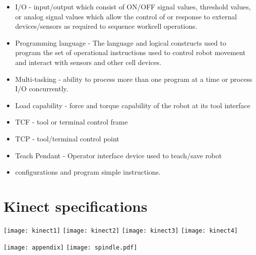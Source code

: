\begin{itemize}
\item I/O - input/output which consist of ON/OFF signal values, threshold values, or analog signal values which allow the control of or response to external devices/sensors as required to sequence workcell operations.
\item Programming language - The language and logical constructs used to program the set of operational instructions used to control robot movement and interact with sensors and other cell devices.
\item Multi-tasking - ability to process more than one program at a time or process I/O concurrently.
\item Load capability - force and torque capability of the robot at its tool interface
\item TCF - tool or terminal control frame
\item TCP - tool/terminal control point
\item Teach Pendant - Operator interface device used to teach/save robot \item configurations and program simple instructions.
\end{itemize}

\newpage
\section{Kinect specifications}
\begin{center}
\texttt{[image: kinect1]}	
\texttt{[image: kinect2]}
\texttt{[image: kinect3]}
\texttt{[image: kinect4]}
\end{center}

\newpage
\texttt{[image: appendix]}
\newpage
\texttt{[image: spindle.pdf]}


